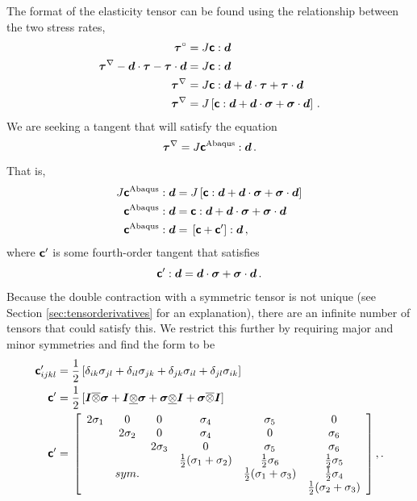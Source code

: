 \documentclass[10pt,letterpaper,oneside]{report}
\newcommand{\ten}[1]{\mbox{\boldmath $#1$}{}}
\newcommand{\tenf}[1]{\mbox{{\sffamily{\bfseries {#1}}}}}
\begin{document}
The format of the elasticity tensor can be found using the relationship between the two stress rates, 
\begin{align}
\ten{ \tau }^{\circ} ={}& J \tenf{c} : \ten{d} 
\\
\ten{\tau}^{\nabla }  - \ten{d} \cdot \ten{\tau} - \ten{\tau} \cdot \ten{d} ={}& J \tenf{c} : \ten{d} 
\notag \\
\ten{\tau}^{\nabla } ={}& J \tenf{c} : \ten{d} + \ten{d} \cdot \ten{\tau} + \ten{\tau} \cdot \ten{d} 
\notag \\
\ten{\tau}^{\nabla } ={}& J \left[ \tenf{c} : \ten{d} + \ten{d} \cdot \ten{\sigma} + \ten{\sigma} \cdot \ten{d} \right] \, .
\end{align}
We are seeking a tangent that will satisfy the equation
\begin{equation}
\ten{\tau}^{\nabla } = J \tenf{c}^\text{Abaqus} : \ten{d} \, . 
\end{equation}
That is, 
\begin{align}
J \tenf{c}^\text{Abaqus} : \ten{d} ={}& J \left[ \tenf{c} : \ten{d} + \ten{d} \cdot \ten{\sigma} + \ten{\sigma} \cdot \ten{d} \right]  
\notag \\
\tenf{c}^\text{Abaqus} : \ten{d} ={}& \tenf{c} : \ten{d} + \ten{d} \cdot \ten{\sigma} + \ten{\sigma} \cdot \ten{d}  
\notag \\
\tenf{c}^\text{Abaqus} : \ten{d} ={}& \left[ \tenf{c} + \tenf{c}' \right] : \ten{d} \, , 
\end{align}
where $\tenf{c}'$ is some fourth-order tangent that satisfies
\begin{equation}
\tenf{c}' : \ten{d}  = \ten{d} \cdot \ten{\sigma} + \ten{\sigma} \cdot \ten{d} \, . 
\end{equation}
Because the double contraction with a symmetric tensor is not unique (see Section \ref{sec:tensorderivatives} for an explanation), there are an infinite number of tensors that could satisfy this.  We restrict this further by requiring major and minor symmetries and find the form to be
\begin{align}
\tenf{c}'_{ijkl} ={}& \frac{1}{2} \left[ \delta_{ik}\sigma_{jl} + \delta_{il}\sigma_{jk} + \delta_{jk}\sigma_{il} + \delta_{jl}\sigma_{ik} \right]
\\
\tenf{c}' ={}& \frac{1}{2} \left[ \ten{I} \overline{\otimes} \ten{ \sigma}  + \ten{I} \underline{\otimes} \ten{\sigma} + \ten{\sigma} \underline{\otimes} \ten{I} + \ten{\sigma} \overline{\otimes} \ten{I} \right] 
\\
\tenf{c}' ={}& \left[ \begin{array}{cccccc}
2\sigma_1 & 0 & 0 & \sigma_4 & \sigma_5 & 0 \\
 & 2\sigma_2 & 0 & \sigma_4 & 0 & \sigma_6 \\
 &  & 2\sigma_3 & 0 & \sigma_5 & \sigma_6 \\
 &  &  & \frac{1}{2} (\sigma_1 + \sigma_2) & \frac{1}{2} \sigma_6 & \frac{1}{2} \sigma_5 \\
 & sym. &  &  & \frac{1}{2} (\sigma_1 + \sigma_3) & \frac{1}{2} \sigma_4 \\
 &  &  &  &  & \frac{1}{2} (\sigma_2 + \sigma_3)
\end{array} \right], .  
\end{align}
\end{document}
